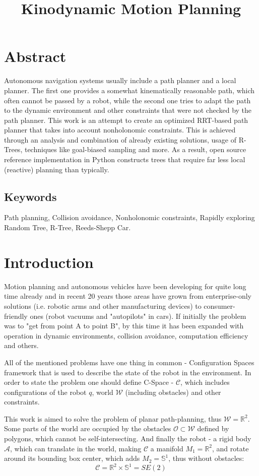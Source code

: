 \documentclass[a4paper,12pt]{article}
\title{Kinodynamic Motion Planning}
\author{}
\DeclareRobustCommand{\[}{\begin{equation}}
\DeclareRobustCommand{\]}{\end{equation}}
\numberwithin{equation}{section}
\numberwithin{algorithm}{section}
\begin{document}
\section{Abstract}

Autonomous navigation systems usually include a path planner and a local planner.
The first one provides a somewhat kinematically reasonable path, which often cannot be passed by a robot,
while the second one tries to adapt the path to the dynamic environment and other constraints that were not checked by the path planner.
This work is an attempt to create an optimized RRT-based path planner that takes into account nonholonomic constraints.
This is achieved through an analysis and combination of already existing solutions, usage of R-Trees, techniques like goal-biased sampling and more. As a result, open source reference implementation in Python constructs trees that require far less local (reactive) planning than typically.
\subsection{Keywords}{}{}\hfill

Path planning, Collision avoidance, Nonholonomic constraints, Rapidly exploring Random Tree, R-Tree, Reeds-Shepp Car.

\section{Introduction}

Motion planning and autonomous vehicles have been developing for quite long time already and in recent 20 years those areas have grown
from enterprise-only solutions (i.e. robotic arms and other manufacturing devices) to consumer-friendly ones (robot vacuums and "autopilots" in cars).
If initially the problem was to "get from point A to point B", by this time it has been expanded with operation in dynamic environments, collision avoidance, computation efficiency and others.

All of the mentioned problems have one thing in common - Configuration Spaces framework that is used to describe the
state of the robot in the environment. In order to state the problem one should define C-Space - $\mathcal{C}$, which includes configurations of the robot $q$, world $\mathcal{W}$ (including obstacles) and other constraints.

This work is aimed to solve the problem of planar path-planning, thus $\mathcal{W}=\mathbb{R}^2$. Some parts of the world are occupied by the obstacles $\mathcal{O}\subset\mathcal{W}$ defined by polygons, which cannot be self-intersecting. And finally the robot - a rigid body $\mathcal{A}$,
which can translate in the world, making $\mathcal{C}$ a manifold $M_1=\mathbb{R}^2$, and rotate around its bounding box center, which adds $M_2=\mathbb{S}^1$, thus without obstacles:
\[
\mathcal{C}=\mathbb{R}^2\times\mathbb{S}^1=SE(2)
\]
\end{document}
